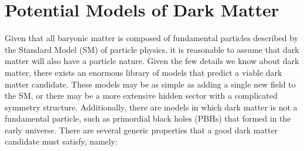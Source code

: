 \section{Potential Models of Dark Matter}
\label{ch1:sec:DM_models}

Given that all baryonic matter is composed of fundamental particles described by the Standard Model (SM) of particle physics, it is reasonable to assume that dark matter will also have a particle nature. Given the few details we know about dark matter, there exists an enormous library of models that predict a viable dark matter candidate.
These models may be as simple as adding a single new field to the SM, or there may be a more extensive hidden sector with a complicated symmetry structure. Additionally, there are models in which dark matter is not a fundamental particle, such as primordial black holes (PBHs) that formed in the early universe. There are several generic properties that a good dark matter candidate must satisfy, namely:

